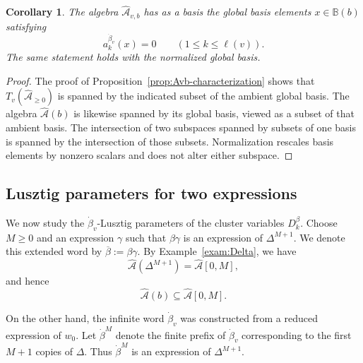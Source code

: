 \documentclass[12pt, reqno]{amsart}
\theoremstyle{plain}
\newtheorem{corollary}[theorem]{Corollary}
\theoremstyle{definition}
\numberwithin{equation}{section}
\newcommand{\cA}{\mathcal{A}}
\begin{document}
\begin{corollary}\label{cor:Avb-based}
The algebra $\widehat{\cA}_{v,b}$ has as a basis the global basis elements
$x\in\mathbb B(b)$ satisfying
\[
    a_k^{\dot\beta_v}(x)=0\qquad(1\leq k\leq\ell(v)).
\]
The same statement holds with the normalized global basis.
\end{corollary}
\begin{proof}
The proof of Proposition~\ref{prop:Avb-characterization} shows that
$T_v(\widehat{\cA}_{\ge0})$ is spanned by the indicated subset of the
ambient global basis. The algebra $\widehat{\cA}(b)$ is likewise
spanned by its global basis, viewed as a subset of that ambient basis.
The intersection of two subspaces spanned by subsets of one basis is
spanned by the intersection of those subsets. Normalization rescales
basis elements by nonzero scalars and does not alter either subspace.
\end{proof}

\subsection{Lusztig parameters for two expressions}
We now study the \(\dot{\beta}_v\)-Lusztig parameters of the cluster variables
\(D_k^\beta\). Choose \(M\ge0\) and an expression \(\gamma\) such that
\(
\beta\gamma
\)
is an expression of \(\Delta^{M+1}\). We denote this extended word by
\(
\overline{\beta}:=\beta\gamma .
\)
By Example~\ref{exam:Delta}, we have
\[
\widehat{\mathcal A}(\Delta^{M+1})
=
\widehat{\mathcal A}[0,M],
\]
and hence
\[
\widehat{\mathcal A}(b)\subseteq \widehat{\mathcal A}[0,M].
\]

On the other hand, the infinite word \(\dot{\beta}_v\) was constructed from a
reduced expression of \(w_0\). Let \(\dot{\beta}^M\) denote the finite prefix of
\(\dot{\beta}_v\) corresponding to the first \(M+1\) copies of \(\Delta\). Thus
\(\dot{\beta}^M\) is an expression of \(\Delta^{M+1}\).
\end{document}
